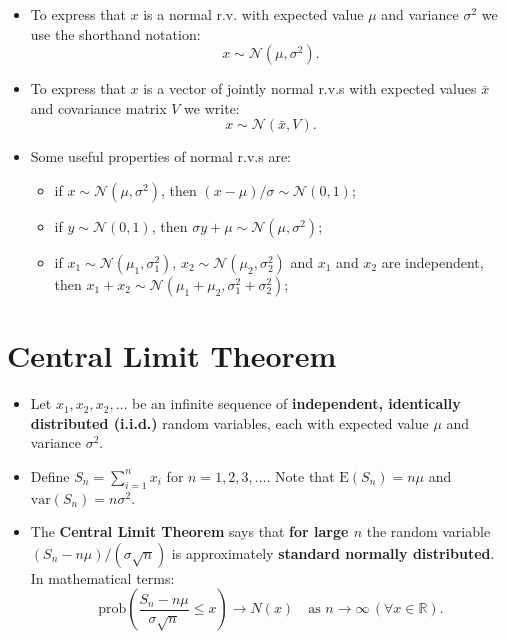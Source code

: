 \begin{itemize}[label=\textbullet]
    \item To express that \( x \) is a normal r.v. with expected value \( \mu \) and variance \( \sigma^2 \) we use the shorthand notation:
    \[
    x \sim \mathcal{N}(\mu, \sigma^2).
    \]
    \item To express that \( x \) is a vector of jointly normal r.v.s with expected values \( \bar{x} \) and covariance matrix \( V \) we write:
    \[
    x \sim \mathcal{N}(\bar{x}, V).
    \]
    \item Some useful properties of normal r.v.s are:
    \begin{itemize}
        \item if \( x \sim \mathcal{N}(\mu, \sigma^2) \), then \( (x - \mu)/\sigma \sim \mathcal{N}(0, 1) \);
        \item if \( y \sim \mathcal{N}(0, 1) \), then \( \sigma y + \mu \sim \mathcal{N}(\mu, \sigma^2) \);
        \item if \( x_1 \sim \mathcal{N}(\mu_1, \sigma_1^2) \), \( x_2 \sim \mathcal{N}(\mu_2, \sigma_2^2) \) and \( x_1 \) and \( x_2 \) are independent, then \( x_1 + x_2 \sim \mathcal{N}(\mu_1 + \mu_2, \sigma_1^2 + \sigma_2^2) \);
    \end{itemize}
\end{itemize}

\section{Central Limit Theorem}

\begin{itemize}[label=\textbullet]
    \item Let \( x_1, x_2, x_2, \ldots \) be an infinite sequence of \textbf{independent, identically distributed (i.i.d.)} random variables, each with expected value \( \mu \) and variance \( \sigma^2 \).
    \item Define \( S_n = \sum_{i=1}^n x_i \) for \( n = 1, 2, 3, \ldots \). Note that \(\text{E}(S_n) = n\mu\) and \(\text{var}(S_n) = n\sigma^2\).
    \item The \textbf{Central Limit Theorem} says that \textbf{for large \( n \)} the random variable \((S_n - n\mu)/(\sigma \sqrt{n})\) is approximately \textbf{standard normally distributed}. In mathematical terms:
    \[
    \text{prob} \left( \frac{S_n - n\mu}{\sigma \sqrt{n}} \leq x \right) \to N(x) \quad \text{as } n \to \infty \, (\forall x \in \mathbb{R}).
    \]
\end{itemize}


